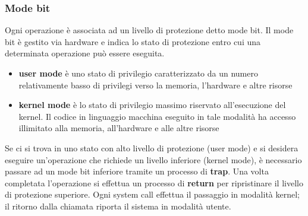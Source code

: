 \documentclass[a4paper]{article}
\begin{document}
\subsubsection*{Mode bit}
Ogni operazione è associata ad un livello di protezione detto mode bit. Il mode bit è gestito via hardware e indica lo stato di
protezione entro cui una determinata operazione può essere eseguita. 
\begin{itemize}
	\item \textbf{user mode} è uno stato di privilegio caratterizzato da un numero relativamente basso di privilegi verso la
	memoria, l'hardware e altre risorse
	\item \textbf{kernel mode} è lo stato di privilegio massimo riservato all'esecuzione del kernel. Il codice in linguaggio
	macchina eseguito in tale modalità ha accesso illimitato alla memoria, all'hardware e alle altre risorse
\end{itemize}
Se ci si trova in uno stato con alto livello di protezione (user mode) e si desidera eseguire un'operazione che richiede un
livello inferiore (kernel mode), è necessario passare ad un mode bit inferiore tramite un processo di \textbf{trap}. Una volta
completata l'operazione si effettua un processo di \textbf{return} per ripristinare il livello di protezione superiore.
Ogni system call effettua il passaggio in modalità kernel; il ritorno dalla chiamata riporta il sistema in modalità utente.
\end{document}
